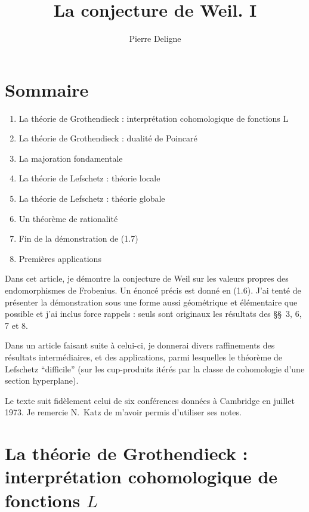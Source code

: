 \documentclass[12pt,a4paper]{amsart}
\theoremstyle{plain}
\theoremstyle{definition}
\theoremstyle{remark}
\numberwithin{equation}{section}
\begin{document}
\title{La conjecture de Weil. I}
\author{Pierre Deligne}
\maketitle

\section*{Sommaire}
\begin{enumerate}
\item[1.] La th\'eorie de Grothendieck : interpr\'etation cohomologique de fonctions L 
\item[2.] La th\'eorie de Grothendieck : dualit\'e de Poincar\'e 
\item[3.] La majoration fondamentale 
\item[4.] La th\'eorie de Lefschetz : th\'eorie locale 
\item[5.] La th\'eorie de Lefschetz : th\'eorie globale 
\item[6.] Un th\'eor\`eme de rationalit\'e 
\item[7.] Fin de la d\'emonstration de (1.7) 
\item[8.] Premi\`eres applications 
\end{enumerate}

\bigskip

Dans cet article, je d\'emontre la conjecture de Weil sur les valeurs propres des endomorphismes de Frobenius. Un \'enonc\'e pr\'ecis est donn\'e en (1.6). J'ai tent\'e de pr\'esenter la d\'emonstration sous une forme aussi g\'eom\'etrique et \'el\'ementaire que possible et j'ai inclus force rappels : seuls sont originaux les r\'esultats des \S\S\ 3, 6, 7 et 8.

Dans un article faisant suite \`a celui-ci, je donnerai divers raffinements des r\'esultats interm\'ediaires, et des applications, parmi lesquelles le th\'eor\`eme de Lefschetz ``difficile'' (sur les cup-produits it\'er\'es par la classe de cohomologie d'une section hyperplane).

Le texte suit fid\`element celui de six conf\'erences donn\'ees \`a Cambridge en juillet 1973. Je remercie N.~Katz de m'avoir permis d'utiliser ses notes.

\section{La th\'eorie de Grothendieck : interpr\'etation cohomologique de fonctions $L$}
\end{document}
